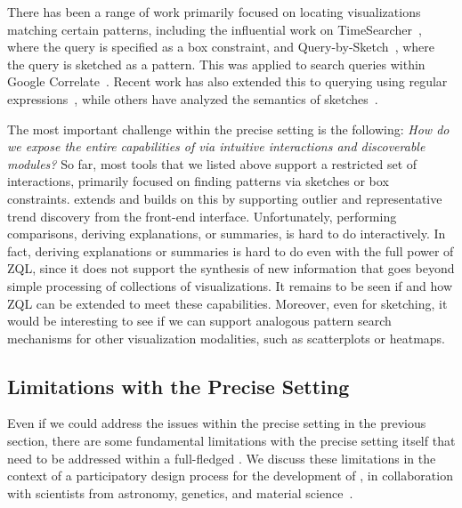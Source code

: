 There has been a range of work primarily focused on locating visualizations
matching certain patterns, including the influential work
on TimeSearcher~\cite{hochheiser2004dynamic}, where the query is
specified as a box constraint, and 
Query-by-Sketch~\cite{wattenberg2001sketching}, where the query is 
sketched as a pattern. 
This was applied to search queries within Google Correlate~\cite{mohebbi2011google}. 
Recent work has also extended this to querying using regular
expressions~\cite{Zgraggen2015}, while
others have analyzed the semantics
of sketches~\cite{Mannino2018,correll2016semantics}.

The most important challenge within the precise setting
is the following: {\em How do we expose the entire capabilities of
 \vidaql via intuitive interactions and discoverable
modules?} So far, most tools that we listed above
support a restricted set of interactions,
primarily focused on finding patterns via sketches or box constraints. 
\zv extends and builds on this 
by supporting outlier and representative trend discovery
from the front-end interface. 
Unfortunately, performing comparisons, deriving explanations, or summaries,
is hard to do interactively. 
In fact, deriving explanations or summaries
is hard to do even with the full power of ZQL, since
it does not support the synthesis of new information
that goes beyond simple processing of collections of visualizations. 
It remains to be seen if and how ZQL can be extended to meet these capabilities.
Moreover, even for sketching, it would be interesting to see if
we can support analogous pattern search mechanisms
for other visualization modalities, such
as scatterplots
or heatmaps.


\subsection{Limitations with the Precise Setting}
\par Even if we could address 
the issues within the precise setting
in the previous section,
there are some fundamental limitations
with the precise setting itself 
that need to be addressed within a full-fledged \vida.
We discuss these limitations
in the context of a participatory 
design process for the development 
of \zv, in collaboration
with scientists from astronomy, genetics, 
and material science~\cite{Lee2017}. 


